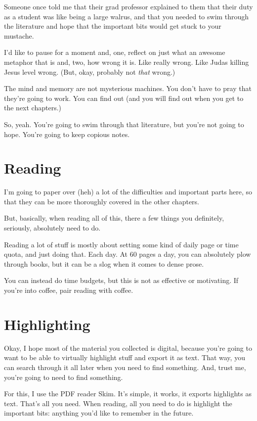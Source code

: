 Someone once told me that their grad professor explained to them that their
duty as a student was like being a large walrus, and that you needed to swim
through the literature and hope that the important bits would get stuck to your
mustache.

I'd like to pause for a moment and, one, reflect on just what an awesome
metaphor that is and, two, how wrong it is. Like really wrong. Like Judas
killing Jesus level wrong. (But, okay, probably not \textit{that} wrong.)

The mind and memory
are not mysterious machines. You don't have to pray that they're going to
work. You can find out (and you will find out when you get to
the next chapters.)

So, yeah. You're going to swim through that literature, but you're not going to
hope. You're going to keep copious notes.

\section{Reading}

I'm going to paper over (heh) a lot of the difficulties and important parts
here, so that they can be more thoroughly covered in the other chapters.

But, basically, when reading all of this, there a few things you definitely,
seriously, absolutely need to do.

Reading a lot of stuff is mostly about setting some kind of daily page or time
quota, and just doing that. Each day. At 60 pages a day, you can absolutely plow
through books, but it can be a slog when it comes to dense prose.

You can instead do time budgets, but this is not as effective or motivating. If
you're into coffee, pair reading with coffee.

\section{Highlighting}

Okay, I hope most of the material you collected is digital, because you're
going to want to be able to virtually highlight stuff and export it as
text. That way, you can search through it all later when you need to find
something. And, trust me, you're going to need to find something.

For this, I use the PDF reader Skim. It's simple, it works, it exports
highlights as text. That's all you need. When reading, all you need to do is
highlight the important bits: anything you'd like to remember in the future.

